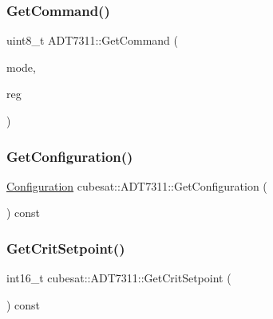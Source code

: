 \subsubsection{\texorpdfstring{Get\+Command()}{GetCommand()}}
{\footnotesize\ttfamily uint8\+\_\+t A\+D\+T7311\+::\+Get\+Command (\begin{DoxyParamCaption}\item[{\hyperlink{classcubesat_1_1ADT7311_a4a6cb79b6b3ec095455c94b20c9ca59e}{Command\+Mode}}]{mode,  }\item[{\hyperlink{classcubesat_1_1ADT7311_a0c841a239b3da653d4304377b3e83b45}{Register}}]{reg }\end{DoxyParamCaption})\hspace{0.3cm}{\ttfamily [private]}}

\mbox{\label{classcubesat_1_1ADT7311_af51b8fd845ccdabb5be82263025de820}} 
\subsubsection{\texorpdfstring{Get\+Configuration()}{GetConfiguration()}}
{\footnotesize\ttfamily \hyperlink{unioncubesat_1_1ADT7311_1_1Configuration}{Configuration} cubesat\+::\+A\+D\+T7311\+::\+Get\+Configuration (\begin{DoxyParamCaption}{ }\end{DoxyParamCaption}) const\hspace{0.3cm}{\ttfamily [inline]}}

\mbox{\label{classcubesat_1_1ADT7311_ace49d19de024ba042aa8f9cfd6aee526}} 
\subsubsection{\texorpdfstring{Get\+Crit\+Setpoint()}{GetCritSetpoint()}}
{\footnotesize\ttfamily int16\+\_\+t cubesat\+::\+A\+D\+T7311\+::\+Get\+Crit\+Setpoint (\begin{DoxyParamCaption}{ }\end{DoxyParamCaption}) const\hspace{0.3cm}{\ttfamily [inline]}}



